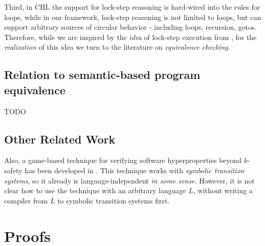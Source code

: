 \documentclass{article}
\begin{document}
Third, in CHL the support for lock-step reasoning is hard-wired into the rules for loops,
while in our framework, lock-step reasoning is not limited to loops, but can support arbitrary sources
of circular behavior - including loops, recursion, gotos.
Therefore, while we are inspired by the \emph{idea} of lock-step execution from \cite{SousaD16},
for the \emph{realization} of this idea we turn to the literature on \emph{equivalence checking}.

\subsection{Relation to semantic-based program equivalence}

TODO

\subsection{Other Related Work}


Also, a game-based technique for verifying software hyperproperties beyond $k$-safety
has been developed in \cite{BeutnerF22}.
This technique works with \emph{symbolic transition systems},
so it already is language-independent \emph{in some sense}. However, it is not clear how to use the technique
with an arbitrary language $L$, without writing a compiler from $L$ to symbolic transition systems first.






\appendix

\section{Proofs}

\end{document}
